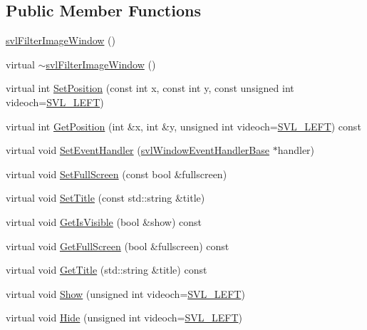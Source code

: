 \subsection*{Public Member Functions}
\begin{DoxyCompactItemize}
\item 
\hyperlink{classsvl_filter_image_window_a847d2399da203ee78a5ae00f1d3f3d9a}{svl\+Filter\+Image\+Window} ()
\item 
virtual \hyperlink{classsvl_filter_image_window_aa81cb54a181f6a91df255fc82e22cfcd}{$\sim$svl\+Filter\+Image\+Window} ()
\item 
virtual int \hyperlink{classsvl_filter_image_window_a28c6aa750e0f27ed40569ff06384df55}{Set\+Position} (const int x, const int y, const unsigned int videoch=\hyperlink{svl_definitions_8h_ab9fec7615f19c8df2919eebcab0b187f}{S\+V\+L\+\_\+\+L\+E\+F\+T})
\item 
virtual int \hyperlink{classsvl_filter_image_window_abc6056097913c5bde5b05ad0d014cafb}{Get\+Position} (int \&x, int \&y, unsigned int videoch=\hyperlink{svl_definitions_8h_ab9fec7615f19c8df2919eebcab0b187f}{S\+V\+L\+\_\+\+L\+E\+F\+T}) const 
\item 
virtual void \hyperlink{classsvl_filter_image_window_a1558def4df8d3eac8ef9010471510d90}{Set\+Event\+Handler} (\hyperlink{classsvl_window_event_handler_base}{svl\+Window\+Event\+Handler\+Base} $\ast$handler)
\item 
virtual void \hyperlink{classsvl_filter_image_window_a3810e3d49643e4310fcd9f10fb54d40f}{Set\+Full\+Screen} (const bool \&fullscreen)
\item 
virtual void \hyperlink{classsvl_filter_image_window_adbdf54ba426a39fca253a1a053e4ac9a}{Set\+Title} (const std\+::string \&title)
\item 
virtual void \hyperlink{classsvl_filter_image_window_aed9946114ccf3dcf437d1ad5814d353a}{Get\+Is\+Visible} (bool \&show) const 
\item 
virtual void \hyperlink{classsvl_filter_image_window_a211c3d80d674cff53206c771638b3b68}{Get\+Full\+Screen} (bool \&fullscreen) const 
\item 
virtual void \hyperlink{classsvl_filter_image_window_ad989c27c31f3ed47da7512af4b0babdd}{Get\+Title} (std\+::string \&title) const 
\item 
virtual void \hyperlink{classsvl_filter_image_window_aa0d8485450ddfd2ed3cff360411d07ef}{Show} (unsigned int videoch=\hyperlink{svl_definitions_8h_ab9fec7615f19c8df2919eebcab0b187f}{S\+V\+L\+\_\+\+L\+E\+F\+T})
\item 
virtual void \hyperlink{classsvl_filter_image_window_a0b73ccfe47ae433f8e7c52225adff2db}{Hide} (unsigned int videoch=\hyperlink{svl_definitions_8h_ab9fec7615f19c8df2919eebcab0b187f}{S\+V\+L\+\_\+\+L\+E\+F\+T})
\end{DoxyCompactItemize}
